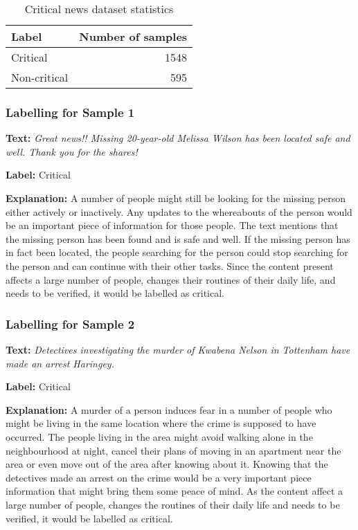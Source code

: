 \begin{table}[h]
\begin{center}
\caption{Critical news dataset statistics}
\label{tbl:dataset_statistics}
\begin{tabular}{lr}
\toprule 
Label&Number of samples\\
\midrule 
Critical&1548\\
Non-critical&595\\
\bottomrule
\end{tabular}
\end{center}
\end{table}

\subsubsection{Labelling for Sample 1}
\textbf{Text:}
\textit{Great news!! Missing 20-year-old Melissa Wilson has been located safe and well. Thank you for the shares!}\par
\textbf{Label:} Critical\par
\textbf{Explanation:} A number of people might still be looking for the missing person either actively or inactively. Any updates to the whereabouts of the person would be an important piece of information for those people. The text mentions that the missing person has been found and is safe and well. If the missing person has in fact been located, the people searching for the person could stop searching for the person and can continue with their other tasks. Since the content present affects a large number of people, changes their routines of their daily life, and needs to be verified, it would be labelled as critical.

\subsubsection{Labelling for Sample 2}
\textbf{Text:}
\textit{Detectives investigating the murder of Kwabena Nelson in Tottenham have made an arrest Haringey.}\par
\textbf{Label:} Critical\par
\textbf{Explanation:} A murder of a person induces fear in a number of people who might be living in the same location where the crime is supposed to have occurred. The people living in the area might avoid walking alone in the neighbourhood at night, cancel their plans of moving in an apartment near the area or even move out of the area after knowing about it. Knowing that the detectives made an arrest on the crime would be a very important piece information that might bring them some peace of mind. As the content affect a large number of people, changes the routines of their daily life and needs to be verified, it would be labelled as critical.

